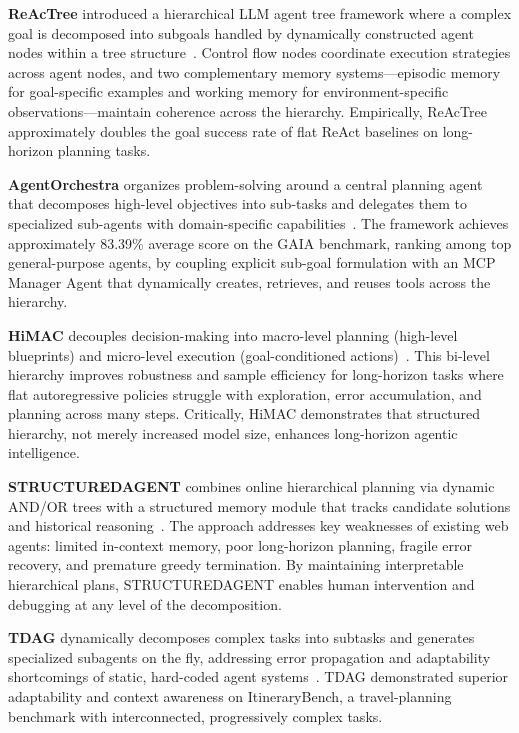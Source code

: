 \textbf{ReAcTree} introduced a hierarchical LLM agent tree framework where a complex goal is decomposed into subgoals handled by dynamically constructed agent nodes within a tree structure~\cite{arxiv:2511.02424}. Control flow nodes coordinate execution strategies across agent nodes, and two complementary memory systems---episodic memory for goal-specific examples and working memory for environment-specific observations---maintain coherence across the hierarchy. Empirically, ReAcTree approximately doubles the goal success rate of flat ReAct baselines on long-horizon planning tasks.

\textbf{AgentOrchestra} organizes problem-solving around a central planning agent that decomposes high-level objectives into sub-tasks and delegates them to specialized sub-agents with domain-specific capabilities~\cite{arxiv:2506.12508v3}. The framework achieves approximately 83.39\% average score on the GAIA benchmark, ranking among top general-purpose agents, by coupling explicit sub-goal formulation with an MCP Manager Agent that dynamically creates, retrieves, and reuses tools across the hierarchy.

\textbf{HiMAC} decouples decision-making into macro-level planning (high-level blueprints) and micro-level execution (goal-conditioned actions)~\cite{arxiv:2603.00977v1}. This bi-level hierarchy improves robustness and sample efficiency for long-horizon tasks where flat autoregressive policies struggle with exploration, error accumulation, and planning across many steps. Critically, HiMAC demonstrates that structured hierarchy, not merely increased model size, enhances long-horizon agentic intelligence.

\textbf{STRUCTUREDAGENT} combines online hierarchical planning via dynamic AND/OR trees with a structured memory module that tracks candidate solutions and historical reasoning~\cite{arxiv:2603.05294v1}. The approach addresses key weaknesses of existing web agents: limited in-context memory, poor long-horizon planning, fragile error recovery, and premature greedy termination. By maintaining interpretable hierarchical plans, STRUCTUREDAGENT enables human intervention and debugging at any level of the decomposition.

\textbf{TDAG} dynamically decomposes complex tasks into subtasks and generates specialized subagents on the fly, addressing error propagation and adaptability shortcomings of static, hard-coded agent systems~\cite{arxiv:2402.10178}. TDAG demonstrated superior adaptability and context awareness on ItineraryBench, a travel-planning benchmark with interconnected, progressively complex tasks.

